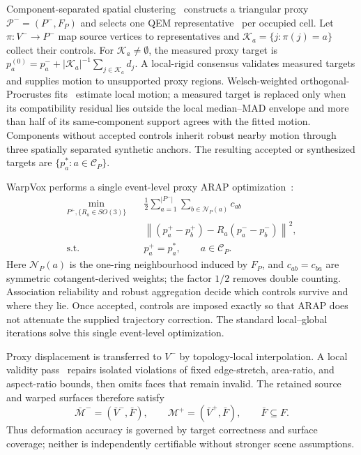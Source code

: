 Component-separated spatial clustering~\cite{rossignac1993vertexclustering}
constructs a triangular proxy $\mathcal P^-=(P^-,F_P)$ and selects one QEM
representative~\cite{garland1997qem} per occupied cell. Let
$\pi:V^-\rightarrow P^-$ map source vertices to representatives and
$\mathcal K_a=\{j:\pi(j)=a\}$ collect their controls. For
$\mathcal K_a\neq\emptyset$, the measured proxy target is
$p_a^{(0)}=p_a^-+|\mathcal K_a|^{-1}\sum_{j\in\mathcal K_a}d_j$.
A local-rigid consensus validates measured targets and supplies motion to
unsupported proxy regions. Welsch-weighted orthogonal-Procrustes
fits~\cite{schoenemann1966procrustes,yao2020welsch} estimate local motion; a
measured target is replaced only when its compatibility residual lies outside
the local median--MAD envelope and more than half of its same-component support
agrees with the fitted motion. Components without accepted controls inherit
robust nearby motion through three spatially separated synthetic anchors. The
resulting accepted or synthesized targets are
$\{p_a^*:a\in\mathcal C_P\}$.

WarpVox performs a single event-level proxy ARAP
optimization~\cite{ARAP_modeling:2007,
10.1007/978-3-662-05105-4_2,libigl}:
\begin{equation}
\begin{aligned}
\min_{P^+,\{R_a\in SO(3)\}}\quad
&\frac{1}{2}\sum_{a=1}^{|P^-|}
\sum_{b\in\mathcal N_P(a)}c_{ab}\\[-1mm]
&\left\|(p_a^+-p_b^+)-R_a(p_a^--p_b^-)\right\|^2,\\
\text{s.t.}\quad
&p_a^+=p_a^*,\qquad a\in\mathcal C_P .
\end{aligned}
\label{eq:arap}
\end{equation}
Here $\mathcal N_P(a)$ is the one-ring neighbourhood induced by $F_P$, and
$c_{ab}=c_{ba}$ are symmetric cotangent-derived weights; the factor $1/2$
removes double counting. Association reliability and robust aggregation decide
which controls survive and where they lie. Once accepted, controls are imposed
exactly so that ARAP does not attenuate the supplied trajectory correction.
The standard local--global iterations solve this single event-level
optimization.

Proxy displacement is transferred to $V^-$ by topology-local interpolation. A
local validity pass~\cite{sorkine2004laplacian,aigerman2013bounded} repairs
isolated violations of fixed edge-stretch, area-ratio, and aspect-ratio bounds,
then omits faces that remain invalid. The
retained source and warped surfaces therefore satisfy
\begin{equation}
\bar{\mathcal M}^-=(\bar V^-,\bar F),
\qquad
\mathcal M^+=(\bar V^+,\bar F),
\qquad
\bar F\subseteq F.
\label{eq:retained_topology}
\end{equation}
Thus deformation accuracy is governed by target correctness and surface
coverage; neither is independently certifiable without stronger scene
assumptions.

